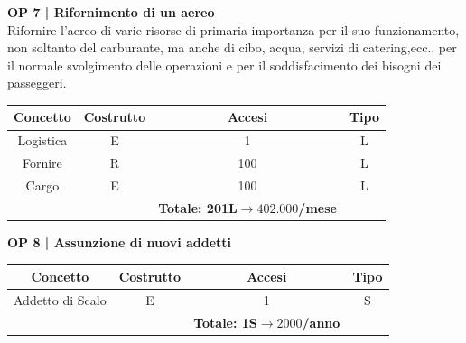 \vspace{.6cm}



\textbf{\small OP 7 | Rifornimento di un aereo}\\

\textsf{\small Rifornire l'aereo di varie risorse di primaria importanza per il suo funzionamento, non soltanto del carburante, ma anche di cibo, acqua, servizi di catering,ecc.. per il normale svolgimento delle operazioni e per il soddisfacimento dei bisogni dei passeggeri.}\break

\begin{tabular}{ c c c c}
	\hline
	\rowcolor{airforceblue}
	\textbf{\color{white}Concetto} & \textbf{\color{white}Costrutto} & \textbf{\color{white}Accesi} & \textbf{\color{white}Tipo}\\
	\hline
	\textsf{\small Logistica} & \textsf{\small E} & \textsf{\small 1} &  \textsf{\small L}\\
	\hline
	\textsf{\small Fornire} & \textsf{\small R} & \textsf{\small 100} &  \textsf{\small L}\\
	\hline
	\textsf{\small Cargo} & \textsf{\small E} & \textsf{\small 100} &  \textsf{\small L}\\
	\hline
	\rowcolor{airforceblue}
	\textsf{\small } & \textsf{\small } & \textbf{\color{white}Totale: 201L$\rightarrow 402.000$/mese } \textsf{\small } & \textsf{\small }\\ %
	\hline
\end{tabular}

\vspace{.6cm}


\textbf{\small OP 8 | Assunzione di nuovi addetti}\\

\begin{tabular}{ c c c c}
	\hline
	\rowcolor{airforceblue}
	\textbf{\color{white}Concetto} & \textbf{\color{white}Costrutto} & \textbf{\color{white}Accesi} & \textbf{\color{white}Tipo}\\
	\hline
	\textsf{\small Addetto di Scalo} & \textsf{\small E} & \textsf{\small 1} &  \textsf{\small S}\\
	\hline
	\rowcolor{airforceblue}
	\textsf{\small } & \textsf{\small } & \textbf{\color{white}Totale: 1S$\rightarrow 2000$/anno } \textsf{\small } & \textsf{\small }\\ %
	\hline
\end{tabular}

